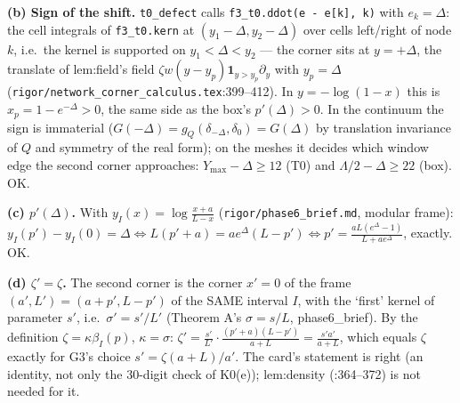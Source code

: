 \documentclass[11pt]{article}
\begin{document}
\textbf{(b) Sign of the shift.} \texttt{t0\_defect} calls \texttt{f3\_t0.ddot(e - e[k], k)} with $e_k=\Delta$: the cell
integrals of \texttt{f3\_t0.kern} at $(y_1-\Delta,y_2-\Delta)$ over cells left/right of node $k$, i.e.\ the kernel is
supported on $y_1<\Delta<y_2$ --- the corner sits at $y=+\Delta$, the translate of lem:field's field
$\zeta w(y-y_p)\mathbf 1_{y>y_p}\partial_y$ with $y_p=\Delta$ (\texttt{rigor/network\_corner\_calculus.tex}:399--412). In
$y=-\log(1-x)$ this is $x_p=1-e^{-\Delta}>0$, the same side as the box's $p'(\Delta)>0$. In the continuum the sign is
immaterial ($G(-\Delta)=g_Q(\delta_{-\Delta},\delta_0)=G(\Delta)$ by translation invariance of $Q$ and symmetry of the real
form); on the meshes it decides which window edge the second corner approaches: $Y_{\max}-\Delta\ge12$ (T0) and
$\Lambda/2-\Delta\ge22$ (box). OK.

\textbf{(c) $p'(\Delta)$.} With $y_I(x)=\log\frac{x+a}{L-x}$ (\texttt{rigor/phase6\_brief.md}, modular frame):
$y_I(p')-y_I(0)=\Delta\iff L(p'+a)=a e^{\Delta}(L-p')\iff p'=\frac{aL(e^{\Delta}-1)}{L+ae^{\Delta}}$, exactly. OK.

\textbf{(d) $\zeta'=\zeta$.} The second corner is the corner $x'=0$ of the frame $(a',L')=(a+p',L-p')$ of the SAME interval
$I$, with the `first' kernel of parameter $s'$, i.e.\ $\sigma'=s'/L'$ (Theorem A's $\sigma=s/L$, phase6\_brief). By the
definition $\zeta=\kappa\beta_I(p)$, $\kappa=\sigma$: $\zeta'=\frac{s'}{L'}\cdot\frac{(p'+a)(L-p')}{a+L}=\frac{s'a'}{a+L}$, which
equals $\zeta$ exactly for G3's choice $s'=\zeta(a+L)/a'$. The card's statement is right (an identity, not only the
30-digit check of K0(e)); lem:density (:364--372) is not needed for it.
\end{document}
